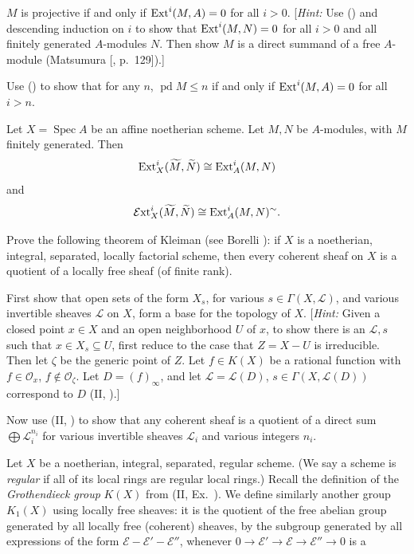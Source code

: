 {{\begin{description}[style=multiline,labelwidth=1.9em,leftmargin=2.25em,itemsep=3pt,topsep=0pt,parsep=0pt]
\begin{parts}
\item\hypertarget{ex-III-6.6a}{} $M$ is projective if and only if $\operatorname{Ext}^i(M,A)=0$ for all $i>0$. [\emph{Hint:} Use () and descending induction on $i$ to show that $\operatorname{Ext}^i(M,N)=0$ for all $i>0$ and all finitely generated $A$-modules $N$. Then show $M$ is a direct summand of a free $A$-module (Matsumura [, p.~129]).]
\item Use () to show that for any $n$, $\operatorname{pd}M\le n$ if and only if $\operatorname{Ext}^i(M,A)=0$ for all $i>n$.
\end{parts}
\item[\hypertarget{ex-III-6.7}{}6.7.] Let $X=\operatorname{Spec}A$ be an affine noetherian scheme. Let $M,N$ be $A$-modules, with $M$ finitely generated. Then
\[
\operatorname{Ext}_X^i(\widetilde M,\widetilde N)\cong\operatorname{Ext}_A^i(M,N)
\]
and
\[
\operatorname{\mathcal E xt}_X^i(\widetilde M,\widetilde N)\cong\operatorname{Ext}_A^i(M,N)^\sim.
\]
\item[\hypertarget{ex-III-6.8}{}6.8.] Prove the following theorem of Kleiman (see Borelli ): if $X$ is a noetherian, integral, separated, locally factorial scheme, then every coherent sheaf on $X$ is a quotient of a locally free sheaf (of finite rank).
\begin{parts}
\item First show that open sets of the form $X_s$, for various $s\in\Gamma(X,\mathcal L)$, and various invertible sheaves $\mathcal L$ on $X$, form a base for the topology of $X$. [\emph{Hint:} Given a closed point $x\in X$ and an open neighborhood $U$ of $x$, to show there is an $\mathcal L,s$ such that $x\in X_s\subseteq U$, first reduce to the case that $Z=X-U$ is irreducible. Then let $\zeta$ be the generic point of $Z$. Let $f\in K(X)$ be a rational function with $f\in\mathcal O_x$, $f\notin\mathcal O_\zeta$. Let $D=(f)_\infty$, and let $\mathcal L=\mathcal L(D)$, $s\in\Gamma(X,\mathcal L(D))$ correspond to $D$ (II, ).]
\item Now use (II, ) to show that any coherent sheaf is a quotient of a direct sum $\bigoplus\mathcal L_i^{n_i}$ for various invertible sheaves $\mathcal L_i$ and various integers $n_i$.
\end{parts}
\item[\hypertarget{ex-III-6.9}{}6.9.] Let $X$ be a noetherian, integral, separated, regular scheme. (We say a scheme is \emph{regular} if all of its local rings are regular local rings.) Recall the definition of the \emph{Grothendieck group} $K(X)$ from (II, Ex.~). We define similarly another group $K_1(X)$ using locally free sheaves: it is the quotient of the free abelian group generated by all locally free (coherent) sheaves, by the subgroup generated by all expressions of the form $\mathcal E-\mathcal E'-\mathcal E''$, whenever $0\to\mathcal E'\to\mathcal E\to\mathcal E''\to0$ is a
\end{description}
}
}
